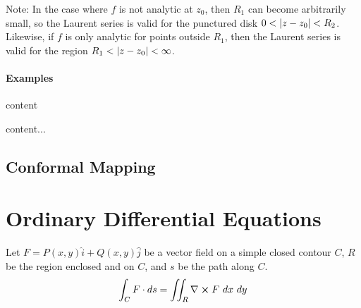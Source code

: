\documentclass[12pt, english]{book}
\begin{document}
	Note: In the case where \(f\) is not analytic at \(z_0\), then \(R_1\) can become arbitrarily small, so the Laurent series is valid for the punctured disk \(0 < \abs{z-z_0}<R_2\). Likewise, if \(f\) is only analytic for points outside \(R_1\), then the Laurent series is valid for the region \(R_1 < \abs{z-z_0} < \infty\).
	
	\subsection{Examples}
	
	\begin{example}[z-transform]
		content
	\end{example}

	\begin{example}
		content...
	\end{example}
	
	
	
	
	
	
	
	
	
	
	
	
	
	
	
	
	
	
	
	
	
	
	
	
	
	
	\chapter{Conformal Mapping} \label{Conformal Mapping Chapter - Complex}
	
	
	
	
	\part{Ordinary Differential Equations} \label{Ordinary Differential Equations Part}
	
	\begin{theorem}
		\label{Green's Theorem - ODE}
		Let \(F = P(x,y) \hat{i} + Q(x,y) \hat{j}\) be a vector field on a simple closed contour \(C\), \(R\) be the region enclosed and on \(C\), and \(s\) be the path along \(C\).
		\begin{align*}
			\int_C F \cdot ds = \iint_R \nabla \cross F \ dx \ dy
		\end{align*}
	\end{theorem}
	
\end{document}
